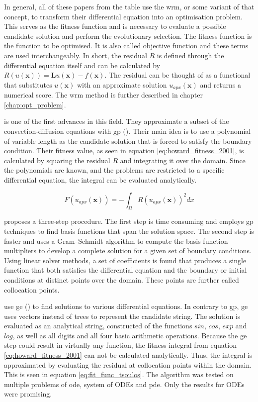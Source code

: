 \documentclass[./\jobname.tex]{subfiles}
\begin{document}
In general, all of these papers from the table use the \gls{wrm}, or some variant of that concept, to transform their differential equation into an optimisation problem. This serves as the fitness function and is necessary to evaluate a possible candidate solution and perform the evolutionary selection. The fitness function is the function to be optimised. It is also called objective function and these terms are used interchangeably. In short, the residual $R$ is defined through the differential equation itself and can be calculated by $R(u(\mathbf{x})) = \mathbf{L}u(\mathbf{x}) - f(\mathbf{x})$. The residual can be thought of as a functional that substitutes $u(\mathbf{x})$ with an approximate solution $u_{apx}(\mathbf{x})$ and returns a numerical score. The \gls{wrm} method is further described in chapter \ref{chap:opt_problem}.

\cite{howard_genetic_2001} is one of the first advances in this field. They approximate a subset of the convection-diffusion equations with \gls{gp} (\cite{koza_genetic_1992}). Their main idea is to use a polynomial of variable length as the candidate solution that is forced to satisfy the boundary condition. Their fitness value, as seen in equation \eqref{eq:howard_fitness_2001}, is calculated by squaring the residual $R$ and integrating it over the domain. Since the polynomials are known, and the problems are restricted to a specific differential equation, the integral can be evaluated analytically. 

\begin{equation}
\label{eq:howard_fitness_2001}
	F(u_{apx}(\mathbf{x})) = -\int_{\Omega} R(u_{apx}(\mathbf{x}))^2 dx
\end{equation}

\cite{kirstukas_hybrid_2005} proposes a three-step procedure. The first step is time consuming and employs \gls{gp} techniques to find basis functions that span the solution space. The second step is faster and uses a Gram–Schmidt algorithm to compute the basis function multipliers to develop a complete solution for a given set of boundary conditions. Using linear solver methods, a set of coefficients is found that produces a single function that both satisfies the differential equation and the boundary or initial conditions at distinct points over the domain. These points are further called collocation points. 

\cite{tsoulos_solving_2006} use \gls{ge} (\cite{ryan_grammatical_1998}) to find solutions to various differential equations. In contrary to \gls{gp}, \gls{ge} uses vectors instead of trees to represent the candidate string. The solution is evaluated as an analytical string, constructed of the functions $sin$, $cos$, $exp$ and $log$, as well as all digits and all four basic arithmetic operations. Because the \gls{ge} step could result in virtually any function, the fitness integral from equation \eqref{eq:howard_fitness_2001} can not be calculated analytically. Thus, the integral is approximated by evaluating the residual at collocation points within the domain. This is seen in equation \eqref{eq:fit_func_tsoulos}. The algorithm was tested on multiple problems of \gls{ode}, system of ODEs and \gls{pde}. Only the results for ODEs were promising.
\end{document}
